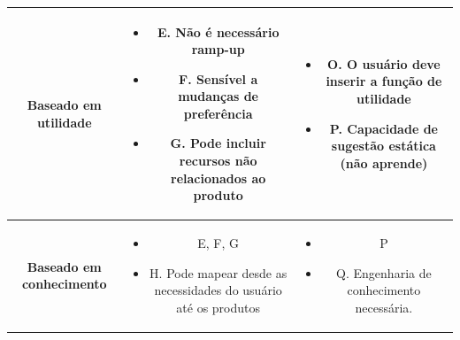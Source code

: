\begin{table}[]
\begin{tabular}{|c|c|c|}
	\textbf{Baseado em utilidade}  & \begin{minipage} [t] {0.3\textwidth} \begin{itemize} \item  E. Não é necessário ramp-up \item F. Sensível a mudanças de preferência \item{G. Pode incluir recursos não relacionados ao produto}\end{itemize} \end{minipage} & \begin{minipage} [t] {0.3\textwidth} \begin{itemize} \item O. O usuário deve inserir a função de utilidade \item P. Capacidade de sugestão estática (não aprende)\end{itemize} \end{minipage} \\ \hline
	\textbf{Baseado em conhecimento}  & \begin{minipage} [t] {0.3\textwidth} \begin{itemize} \item E, F, G \item H. Pode mapear desde as necessidades do usuário até os produtos\end{itemize} \end{minipage} & \begin{minipage} [t] {0.3\textwidth} \begin{itemize} \item P \item Q. Engenharia de conhecimento necessária.\end{itemize} \end{minipage} \\ \hline
	\end{tabular}
\end{table}




